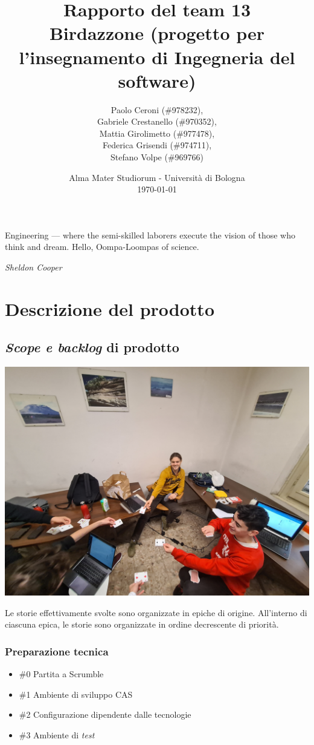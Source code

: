\documentclass{article}
\title{
	\textbf{
		Rapporto del team 13 \\
	}
	\textbf{\large
		Birdazzone \break
		(progetto per l'insegnamento \break
		di Ingegneria del software)
	}
}
\author{
	Paolo Ceroni (\#978232), \\
	Gabriele Crestanello (\#970352), \\
	Mattia Girolimetto (\#977478), \\
	Federica Grisendi (\#974711), \\
	Stefano Volpe (\#969766)
}
\date{
	Alma Mater Studiorum - Universit\`a di Bologna \\
	\today
}
\begin{document}
\maketitle

\epigraph{
	Engineering --- where the semi-skilled laborers execute the vision of those
	who think and dream. Hello, Oompa-Loompas of science.
}{\textit{Sheldon Cooper}}

\thispagestyle{empty}
\pagebreak

\tableofcontents

\pagebreak

\section{Descrizione del prodotto}

\subsection{\emph{Scope e backlog} di prodotto}

\includegraphics[width=\textwidth]{planning-poker.jpg}

Le storie effettivamente svolte sono organizzate in epiche di origine.
All'interno di ciascuna epica, le storie sono organizzate in ordine decrescente
di priorità.

\subsubsection{Preparazione tecnica}

\begin{itemize}
	\item \#0 Partita a Scrumble
	\item \#1 Ambiente di sviluppo CAS
	\item \#2 Configurazione dipendente dalle tecnologie
	\item \#3 Ambiente di \emph{test}
\end{itemize}
\end{document}
